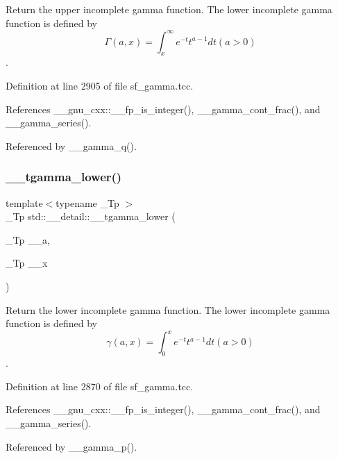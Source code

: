 Return the upper incomplete gamma function. The lower incomplete gamma function is defined by \[ \Gamma(a,x) = \int_x^\infty e^{-t}t^{a-1}dt (a > 0) \]. 



Definition at line 2905 of file sf\+\_\+gamma.\+tcc.



References \+\_\+\+\_\+gnu\+\_\+cxx\+::\+\_\+\+\_\+fp\+\_\+is\+\_\+integer(), \+\_\+\+\_\+gamma\+\_\+cont\+\_\+frac(), and \+\_\+\+\_\+gamma\+\_\+series().



Referenced by \+\_\+\+\_\+gamma\+\_\+q().

\mbox{\label{namespacestd_1_1____detail_ad85ad5ffdb1bab9b1e3b6fd7a114fb0d}} 
\subsubsection{\texorpdfstring{\+\_\+\+\_\+tgamma\+\_\+lower()}{\_\_tgamma\_lower()}}
{\footnotesize\ttfamily template$<$typename \+\_\+\+Tp $>$ \\
\+\_\+\+Tp std\+::\+\_\+\+\_\+detail\+::\+\_\+\+\_\+tgamma\+\_\+lower (\begin{DoxyParamCaption}\item[{\+\_\+\+Tp}]{\+\_\+\+\_\+a,  }\item[{\+\_\+\+Tp}]{\+\_\+\+\_\+x }\end{DoxyParamCaption})}



Return the lower incomplete gamma function. The lower incomplete gamma function is defined by \[ \gamma(a,x) = \int_0^x e^{-t}t^{a-1}dt (a > 0) \]. 



Definition at line 2870 of file sf\+\_\+gamma.\+tcc.



References \+\_\+\+\_\+gnu\+\_\+cxx\+::\+\_\+\+\_\+fp\+\_\+is\+\_\+integer(), \+\_\+\+\_\+gamma\+\_\+cont\+\_\+frac(), and \+\_\+\+\_\+gamma\+\_\+series().



Referenced by \+\_\+\+\_\+gamma\+\_\+p().

\mbox{\label{namespacestd_1_1____detail_af7f54a82d2e5f0d8758cf53ebb2500e8}} 
